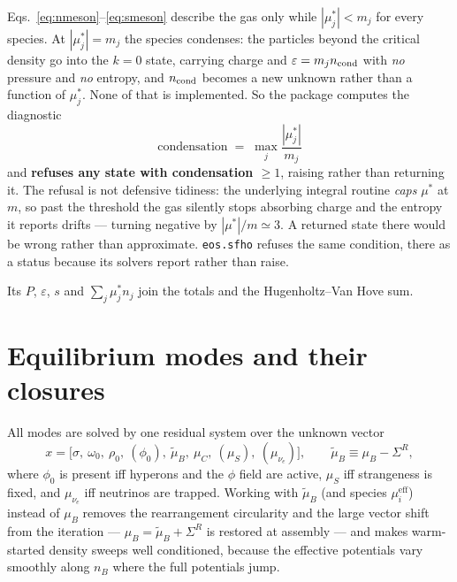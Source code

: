 \documentclass[aps,prc,onecolumn,superscriptaddress,nofootinbib,10pt]{revtex4-2}
\newcommand{\nB}{n_B}
\newcommand{\muB}{\mu_B}
\newcommand{\muC}{\mu_C}
\newcommand{\muS}{\mu_S}
\newcommand{\munue}{\mu_{\nu_e}}
\newcommand{\SigR}{\Sigma^{R}}
\newcommand{\mueff}[1]{\mu^{\mathrm{eff}}_{#1}}
\begin{document}
Eqs.~\eqref{eq:nmeson}--\eqref{eq:smeson} describe the gas only while
$|\mu^*_j| < m_j$ for every species. At $|\mu^*_j| = m_j$ the species
condenses: the particles beyond the critical density go into the $k = 0$
state, carrying charge and $\varepsilon = m_j n_{\rm cond}$ with \emph{no}
pressure and \emph{no} entropy, and $n_{\rm cond}$ becomes a new unknown
rather than a function of $\mu^*_j$. None of that is implemented. So the
package computes the diagnostic
%
\begin{equation}
\text{condensation} \;=\; \max_j \frac{|\mu^*_j|}{m_j}
\label{eq:condensation}
\end{equation}
%
and \textbf{refuses any state with condensation $\ge 1$}, raising rather than
returning it. The refusal is not defensive tidiness: the underlying integral
routine \emph{caps} $\mu^*$ at $m$, so past the threshold the gas silently
stops absorbing charge and the entropy it reports drifts --- turning negative
by $|\mu^*|/m \simeq 3$. A returned state there would be wrong rather than
approximate. \texttt{eos.sfho} refuses the same condition, there as a status
because its solvers report rather than raise.

Its $P$, $\varepsilon$, $s$ and $\sum_j \mu^{*}_j n_j$ join the totals and the
Hugenholtz--Van Hove sum.

\section{Equilibrium modes and their closures}

All modes are solved by one residual system over the unknown vector
%
\begin{equation}
x = \big[ \sigma,\ \omega_0,\ \rho_0,\ (\phi_0),\ \tilde\mu_B,\ \muC,\
          (\muS),\ (\munue) \big],
\qquad \tilde\mu_B \equiv \muB - \SigR ,
\label{eq:unknowns}
\end{equation}
%
where $\phi_0$ is present iff hyperons and the $\phi$ field are active,
$\muS$ iff strangeness is fixed, and $\munue$ iff neutrinos are trapped.
Working with $\tilde\mu_B$ (and species $\mueff{i}$) instead of $\muB$
removes the rearrangement circularity and the large vector shift from the
iteration --- $\muB = \tilde\mu_B + \SigR$ is restored at assembly --- and
makes warm-started density sweeps well conditioned, because the effective
potentials vary smoothly along $\nB$ where the full potentials jump.
\end{document}
